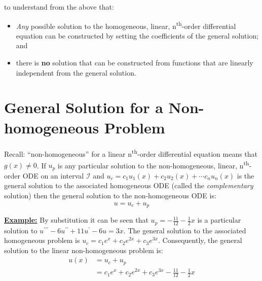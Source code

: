  to understand from the above that:
\begin{itemize}
\item \emph{Any} possible solution to the homogeneous, linear, n\textsuperscript{th}-order differential equation can be constructed by setting the coefficients of the general solution; and
\item there is \textbf{no} solution that can be constructed from functions that are linearly independent from the general solution.
\end{itemize}

\section{General Solution for a Non-homogeneous Problem}
Recall: ``non-homogeneous'' for a linear n\textsuperscript{th}-order differential equation means that $g(x)\ne 0$.  If $u_p$ is any particular solution to the non-homogeneous, linear, n\textsuperscript{th}-order ODE on an interval $\mathcal{I}$ and $u_c = c_1u_1(x) + c_2u_2(x)+\cdots c_nu_n(x)$ is the general solution to the associated homogeneous ODE (called the \emph{complementary} solution) then the general solution to the non-homogeneous ODE is:
\begin{equation*}
u = u_c + u_p
\end{equation*}

\vspace{0.25cm}

\noindent\textbf{\underline{Example:}} By substitution it can be seen that $u_p = -\frac{11}{12}-\frac{1}{2}x$ is a particular solution to $u^{\prime \prime \prime}-6u^{\prime \prime} + 11u^{\prime} - 6u=3x$.  The general solution to the associated homogeneous problem is $u_c = c_1e^{x}+c_2e^{2x}+c_3e^{3x}$.  Consequently, the general solution to the linear non-homogeneous problem is:
\begin{align*}
u(x) &= u_c + u_p \\
&=c_1e^{x}+c_2e^{2x}+c_3e^{3x}-\frac{11}{12}-\frac{1}{2}x
\end{align*}

